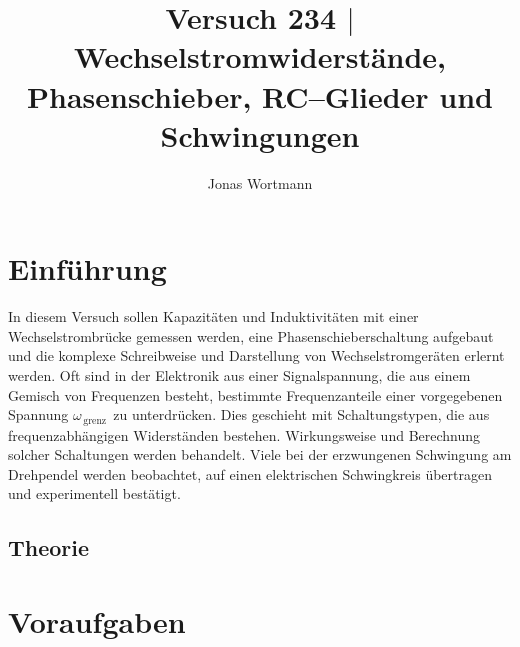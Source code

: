 \documentclass[a4paper,12pt]{article}
\numberwithin{equation}{section}
\begin{document}

\title{Versuch 234 $|$ Wechselstromwiderstände, Phasenschieber, RC--Glieder und Schwingungen}
\author{Jonas Wortmann}
\maketitle
{}


\newpage


\fancyhead[L]{\thepage}
\fancyfoot[C]{}

\tableofcontents


\newpage


\fancyhead[R]{\leftmark\\\rightmark}

\newpage
\section{Einführung}
In diesem Versuch sollen Kapazitäten und Induktivitäten mit einer Wechselstrombrücke gemessen werden, eine Phasenschieberschaltung aufgebaut und die komplexe Schreibweise und Darstellung von Wechselstromgeräten erlernt werden.
Oft sind in der Elektronik aus einer Signalspannung, die aus einem Gemisch von Frequenzen besteht, bestimmte Frequenzanteile einer vorgegebenen Spannung $\omega _{\,\text{grenz}\,}$ zu unterdrücken.
Dies geschieht mit Schaltungstypen, die aus frequenzabhängigen Widerständen bestehen.
\indent Wirkungsweise und Berechnung solcher Schaltungen werden behandelt.
Viele bei der erzwungenen Schwingung am Drehpendel werden beobachtet, auf einen elektrischen Schwingkreis übertragen und experimentell bestätigt.

\subsection{Theorie}

\newpage
\section{Voraufgaben}


\end{document}
